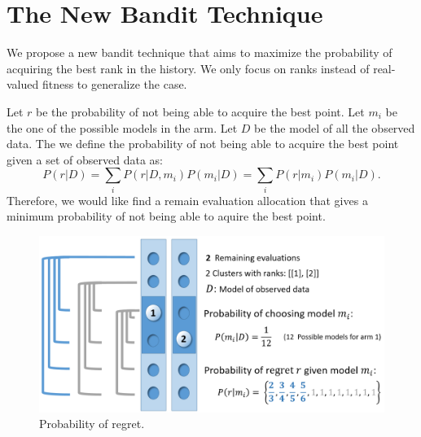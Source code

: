 \section{The New Bandit Technique}

We propose a new bandit technique that aims to maximize the probability of acquiring the best rank in the history.
We only focus on ranks instead of real-valued fitness to generalize the case.

Let $r$ be the probability of not being able to acquire the best point.
Let $m_i$ be the one of the possible models in the arm.
Let $D$ be the model of all the observed data.
The we define the probability of not being able to acquire the best point given a set of observed data as:
\begin{equation}
P(r|D) = \sum_{i} P(r|D, m_i)P(m_i|D) = \sum_{i}P(r|m_i)P(m_i|D).
\end{equation}\label{equation:bandit}
Therefore, we would like find a remain evaluation allocation that gives a minimum probability of not being able to aquire the best point.

\begin{figure}
\centering
\includegraphics[width=\textwidth]{Bandit_arm}
\caption{Probability of regret.}\label{fig:Bandit_arm}
\end{figure} 


